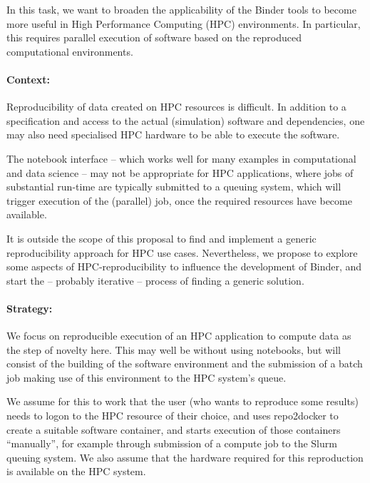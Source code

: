 \begin{task}[
  title=Binder at HPC facilities,
  id=binder-at-hpc,
  lead=MP,
  PM=17,
  partners={SRL,IFR,UIO}
]
In this task, we want to broaden the applicability of the Binder tools to become
more useful in High Performance Computing (HPC) environments. In particular, this
requires parallel execution of software based on the reproduced computational environments.

\paragraph*{Context:}
Reproducibility of data created on HPC resources is difficult. In addition to
a specification and access to the actual (simulation) software and dependencies,
one may also need specialised HPC hardware to be able to execute the software.

The notebook interface -- which works well for many examples in computational and
data science -- may not be appropriate for HPC applications, where jobs of
substantial run-time are typically submitted to a queuing system, which will
trigger execution of the (parallel) job, once the required resources have become
available.

It is outside the scope of this proposal to find and implement a generic
reproducibility approach for HPC use cases. Nevertheless, we propose to explore
some aspects of HPC-reproducibility to influence the development of Binder,
and start the -- probably iterative -- process of finding a generic solution.

\paragraph*{Strategy:}
We focus on reproducible execution of an HPC application to compute data as the step of
novelty here. This may well be without using notebooks, but will consist of the
building of the software environment and the submission of a batch job making use of this
environment to the HPC system's queue.

We assume for this to work that the user (who wants to reproduce some results)
needs to logon to the HPC resource of their choice, and uses repo2docker to
create a suitable software container, and starts execution of those containers
``manually'', for example through submission of a compute job to the Slurm
queuing system. We also assume that the hardware required for this reproduction
is available on the HPC system.


\end{task}
